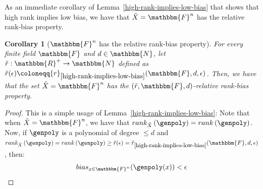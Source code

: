 \documentclass[10pt,a4paper]{article}
\newtheorem{corollary}[theorem]{Corollary}
\newcommand{\definedas}[0]{\coloneqq}
\newcommand{\parens}[1]{\left( #1 \right)}
\newcommand{\basefield}[0]{\mathbbm{F}}
\newcommand{\blocklength}[0]{n}
\newcommand{\field}[0]{\basefield^{\blocklength}}
\newcommand{\degree}[0]{d}
\newcommand{\funcdef}[3]{#1:#2\rightarrow#3}
\newcommand{\naturalnumbersset}[0]{\mathbbm{N}}
\newcommand{\realnumbersset}[0]{\mathbbm{R}}
\newcommand{\variety}{{\tilde{X}}}
\newcommand{\rank}[1]{rank \parens{#1}}
\newcommand{\relrank}[2]{rank_{#1} \parens{#2}}
\newcommand{\rankval}[0]{{{r}}}
\newcommand{\rankbiasfunc}[0]{{\tilde{r}}}
\newcommand{\relbias}[2]{bias_{#1}{({#2})}}
\begin{document}
As an immediate corollary of Lemma~\ref{high-rank-implies-low-bias} that shows that high rank implies low bias, we have that $\variety = \field$ has the relative rank-bias property.
\begin{corollary}[$\field$ has the relative rank-bias property]
    For every finite field $\basefield$ and $\degree \in \naturalnumbersset$, let $\funcdef{\rankbiasfunc}{\realnumbersset^{+}}{\naturalnumbersset}$ defined as $\rankbiasfunc(\epsilon) \definedas \rankval_{\ref{high-rank-implies-low-bias}}(\basefield, \degree, \epsilon)$.
    Then, we have that the set $\variety = \field$ has the $(\rankbiasfunc, \basefield, \degree)$-relative rank-bias property.
\end{corollary}
\begin{proof}
    This is a simple usage of Lemma~\ref{high-rank-implies-low-bias}:
    Note that when $\variety = \field$, we have that $\relrank{\variety}{\genpoly} = \rank{\genpoly}$.
    Now, if $\genpoly$ is a polynomial of degree $\leq \degree$ and $\relrank{\variety}{\genpoly} = \rank{\genpoly} \geq \rankbiasfunc(\epsilon) = \rankbiasfunc_{\ref{high-rank-implies-low-bias}}(\basefield, \degree, \epsilon)$,
    then:
    \[
        \relbias{x \in \field}{\genpoly(x)} < \epsilon
    \]
\end{proof}
\end{document}
